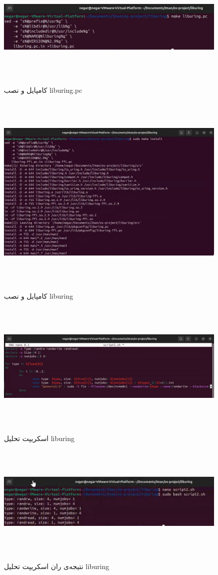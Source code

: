 ‫
‫
‫‫‫\begin{figure}[H]
‫	‫	‫	‫	‫	‫    \centering
‫	‫	‫	‫	‫	‫    \includegraphics[width=\textwidth]{figs/25.jpg}
‫	‫	‫			\caption{کامپایل و نصب liburing.pc}
‫‫\end{figure}
‫
‫
‫‫‫\begin{figure}[H]
‫	‫	‫	‫	‫	‫    \centering
‫	‫	‫	‫	‫	‫    \includegraphics[width=\textwidth]{figs/26.jpg}
‫	‫	‫			\caption{کامپایل و نصب liburing}
‫‫\end{figure}
‫
‫
‫‫‫\begin{figure}[H]
‫	‫	‫	‫	‫    \centering
‫	‫	‫	‫	‫    \includegraphics[width=\textwidth]{figs/27.jpg}
‫	‫			\caption{اسکریپت تحلیل liburing}
‫	‫\end{figure}
‫
‫‫‫\begin{figure}[H]
‫	‫	‫	‫	‫    \centering
‫	‫	‫	‫	‫    \includegraphics[width=\textwidth]{figs/28.jpg}
‫	‫			\caption{نتیجه‌ی ران اسکریپت تحلیل liburing}
‫	‫\end{figure}
